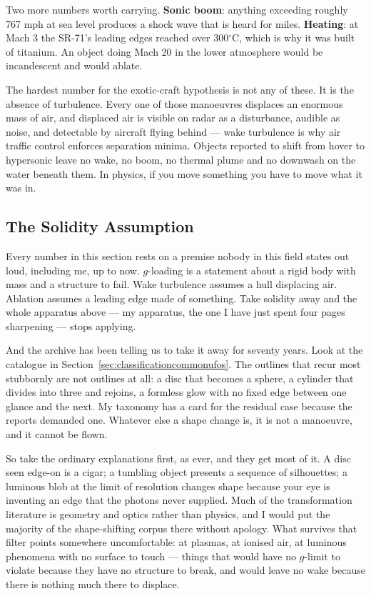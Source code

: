 Two more numbers worth carrying. \textbf{Sonic boom}: anything exceeding roughly 767 mph at sea
level produces a shock wave that is heard for miles.  \textbf{Heating}: at Mach 3 the SR-71's
leading edges reached over 300$^\circ$C, which is why it was built of titanium. An object doing
Mach 20 in the lower atmosphere would be incandescent and would ablate.

\begin{funfact}
The hardest number for the exotic-craft hypothesis is not any of these. It is the absence of
turbulence. Every one of those manoeuvres displaces an enormous mass of air, and displaced air is
visible on radar as a disturbance, audible as noise, and detectable by aircraft flying behind ---
wake turbulence is why air traffic control enforces separation minima. Objects reported to shift
from hover to hypersonic leave no wake, no boom, no thermal plume and no downwash on the water
beneath them. In physics, if you move something you have to move what it was in.
\end{funfact}

\subsection{The Solidity Assumption}\label{sec:solidity}

Every number in this section rests on a premise nobody in this field states out loud, including
me, up to now.  $g$-loading is a statement about a
rigid body with mass and a structure to fail. Wake turbulence assumes a hull displacing air.
Ablation assumes a leading edge made of something. Take solidity away and the whole apparatus
above --- my apparatus, the one I have just spent four pages sharpening --- stops applying.

And the archive has been telling us to take it away for seventy years. Look at the catalogue in
Section~\ref{sec:classificationcommonufos}. The outlines that recur most stubbornly are not
outlines at all: a disc that becomes a sphere, a cylinder that divides into three and rejoins, a
formless glow with no fixed edge between one glance and the next. My taxonomy has a card for the
residual case because the reports demanded one. 
Whatever else a shape change is, it is not a manoeuvre, and it cannot be flown.

So take the ordinary explanations first, as ever, and they get most of it. A disc seen edge-on is
a cigar; a tumbling object presents a sequence of silhouettes; a luminous blob at the limit of
resolution changes shape because your eye is inventing an edge that the photons never supplied.
Much of the transformation literature is geometry and optics rather than physics, and I would put
the majority of the shape-shifting corpus there without apology. What survives that filter
points somewhere uncomfortable: at plasmas, at ionised air, at luminous phenomena with no surface
to touch --- things that would have no $g$-limit to violate because they have no structure to
break, and would leave no wake because there is nothing much there to displace.

